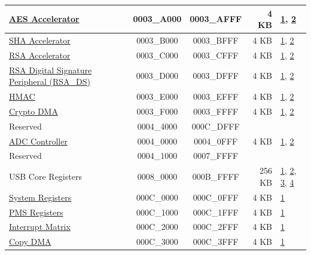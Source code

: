 \begin{longtable}[c]{ |p{5.0cm}|c|c|r|p{1.5cm}| }
               \hyperref[mod:aes]{AES Accelerator}   & \hexprefix{}0003\_A000 & \hexprefix{}0003\_AFFF &   4 KB &        \hyperref[PAM footnote: 1]{1}, \hyperref[PAM footnote: 2]{2}     \\\hline
                \hyperref[mod:sha]{SHA Accelerator}   & \hexprefix{}0003\_B000 & \hexprefix{}0003\_BFFF &   4 KB &      \hyperref[PAM footnote: 1]{1}, \hyperref[PAM footnote: 2]{2}     \\\hline
                \hyperref[mod:rsa]{RSA Accelerator}   & \hexprefix{}0003\_C000 & \hexprefix{}0003\_CFFF &   4 KB &       \hyperref[PAM footnote: 1]{1}, \hyperref[PAM footnote: 2]{2}     \\\hline
                \hyperref[mod:digsig]{RSA Digital Signature Peripheral (RSA\_DS)}   & \hexprefix{}0003\_D000 & \hexprefix{}0003\_DFFF &   4 KB &   \hyperref[PAM footnote: 1]{1}, \hyperref[PAM footnote: 2]{2}     \\\hline
               \hyperref[mod:hmac]{HMAC}    & \hexprefix{}0003\_E000 & \hexprefix{}0003\_EFFF &   4 KB &           \hyperref[PAM footnote: 1]{1}, \hyperref[PAM footnote: 2]{2}     \\\hline
                 \hyperref[mod:dma]{Crypto DMA}  & \hexprefix{}0003\_F000 & \hexprefix{}0003\_FFFF &   4 KB &      \hyperref[PAM footnote: 1]{1}, \hyperref[PAM footnote: 2]{2}     \\\hline

    \rowcolor{gray!25}
  Reserved  & \hexprefix{}0004\_4000 & \hexprefix{}000C\_DFFF &        &                \\\hline
              \hyperref[mod:sensor]{ADC Controller}     & \hexprefix{}0004\_0000 & \hexprefix{}0004\_0FFF &   4 KB &   \hyperref[PAM footnote: 1]{1}, \hyperref[PAM footnote: 2]{2}     \\\hline
    \rowcolor{gray!25}
  Reserved  & \hexprefix{}0004\_1000 & \hexprefix{}0007\_FFFF &        &                \\\hline
              USB Core Registers    & \hexprefix{}0008\_0000 & \hexprefix{}000B\_FFFF & 256 KB &       \hyperref[PAM footnote: 1]{1}, \hyperref[PAM footnote: 2]{2}, \hyperref[PAM footnote: 3]{3}, \hyperref[PAM footnote: 4]{4}  \\\hline
               \hyperref[mod:sysreg]{System Registers}    & \hexprefix{}000C\_0000 & \hexprefix{}000C\_0FFF &   4 KB &  \hyperref[PAM footnote: 1]{1}         \\\hline
                \hyperref[mod:permctrl]{PMS Registers}   & \hexprefix{}000C\_1000 & \hexprefix{}000C\_1FFF &   4 KB &   \hyperref[PAM footnote: 1]{1}         \\\hline
               \hyperref[mod:intmtrx]{Interrupt Matrix}    & \hexprefix{}000C\_2000 & \hexprefix{}000C\_2FFF &   4 KB &   \hyperref[PAM footnote: 1]{1}         \\\hline
             \hyperref[mod:dma]{Copy DMA}      & \hexprefix{}000C\_3000 & \hexprefix{}000C\_3FFF &   4 KB &       \hyperref[PAM footnote: 1]{1}         \\\hline


\end{longtable}
